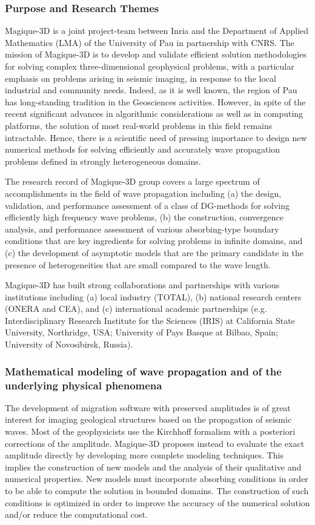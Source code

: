 \subsubsection{Purpose and Research Themes}
    Magique-3D is a joint project-team between Inria and the Department of Applied Mathematics (LMA) of the University of Pau in partnership with CNRS. The mission of Magique-3D is to develop and validate efficient solution methodologies for solving complex three-dimensional geophysical problems, with a particular emphasis on problems arising in seismic imaging, in response to the local industrial and community needs. Indeed, as it is well known, the region of Pau has long-standing tradition in the Geosciences activities. However, in spite of the recent significant advances in algorithmic considerations as well as in computing platforms, the solution of most real-world problems in this field remains intractable. Hence, there is a scientific need of pressing importance to design new numerical methods for solving efficiently and accurately wave propagation problems defined in strongly heterogeneous domains.


The research record of Magique-3D group covers a large spectrum of accomplishments in the field of wave propagation including (a) the design, validation, and performance assessment of a class of DG-methods for solving efficiently high frequency wave problems, (b) the construction, convergence analysis, and performance assessment of various absorbing-type boundary conditions that are key ingredients for solving problems in infinite domains, and (c) the development of asymptotic models that are the primary candidate in the presence of heterogeneities that are small compared to the wave length.

    Magique-3D has built strong collaborations and partnerships with various institutions including (a) local industry (TOTAL), (b) national research centers (ONERA and CEA), and (c) international academic partnerships (e.g. Interdisciplinary Research Institute for the Sciences (IRIS) at California State University, Northridge, USA; University of Pays Basque at Bilbao, Spain; University of Novosibirsk, Russia).

\subsubsection{Mathematical modeling of wave propagation and of the underlying physical phenomena}

    The development of migration software with preserved amplitudes is of great interest for imaging geological structures based on the propagation of seismic waves. Most of the geophysicists use the Kirchhoff formalism with a posteriori corrections of the amplitude. Magique-3D proposes instead to evaluate the exact amplitude directly by developing more complete modeling techniques. This implies the construction of new models and the analysis of their qualitative and numerical properties. New models must incorporate absorbing conditions in order to be able to compute the solution in bounded domains. The construction of such conditions is optimized in order to improve the accuracy of the numerical solution and/or reduce the computational cost.
    

